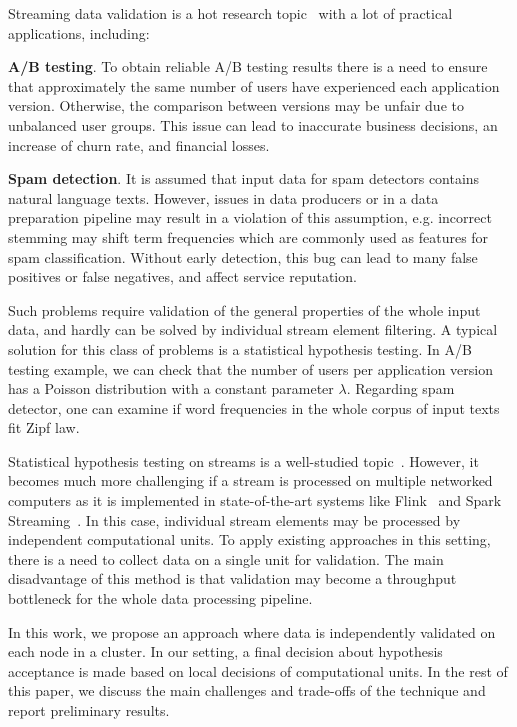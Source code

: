 \label {fs-short-intro}

Streaming data validation is a hot research topic~\cite{Xu:2013:MVS:2488222.2488275, frank2018semantic} with a lot of practical applications, including:

{\bf A/B testing}. To obtain reliable A/B testing results there is a need to ensure that approximately the same number of users have experienced each application version. Otherwise, the comparison between versions may be unfair due to unbalanced user groups. This issue can lead to inaccurate business decisions, an increase of churn rate, and financial losses.
    
{\bf Spam detection}. It is assumed that input data for spam detectors contains natural language texts. However, issues in data producers or in a data preparation pipeline may result in a violation of this assumption, e.g. incorrect stemming may shift term frequencies which are commonly used as features for spam classification. Without early detection, this bug can lead to many false positives or false negatives, and affect service reputation.

Such problems require validation of the general properties of the whole input data, and hardly can be solved by individual stream element filtering. A typical solution for this class of problems is a statistical hypothesis testing. In A/B testing example, we can check that the number of users per application version has a Poisson distribution with a constant parameter $\lambda$. Regarding spam detector, one can examine if word frequencies in the whole corpus of input texts fit Zipf law. 

Statistical hypothesis testing on streams is a well-studied topic~\cite{kifer2004detecting, lall2015data}. However, it becomes much more challenging if a stream is processed on multiple networked computers as it is implemented in state-of-the-art systems like Flink~\cite{Carbone:2017:SMA:3137765.3137777} and Spark Streaming~\cite{Zaharia:2012:DSE:2342763.2342773}. In this case, individual stream elements may be processed by independent computational units. To apply existing approaches in this setting, there is a need to collect data on a single unit for validation. The main disadvantage of this method is that validation may become a throughput bottleneck for the whole data processing pipeline. 

In this work, we propose an approach where data is independently validated on each node in a cluster. In our setting, a final decision about hypothesis acceptance is made based on local decisions of computational units. In the rest of this paper, we discuss the main challenges and trade-offs of the technique and report preliminary results.